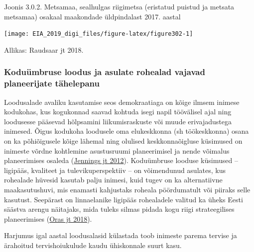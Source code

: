 \documentclass[estonian,]{article}
\begin{document}
{Joonis 3.0.2.} Metsamaa, sealhulgas riigimetsa (eristatud puistud ja metsata metsamaa) osakaal maakondade üldpindalast 2017. aastal

\begin{center}\texttt{[image: EIA\_2019\_digi\_files/figure-latex/figure302-1]} \end{center}

\begin{imgsource}
{Allikas:} Raudsaar jt 2018.
\end{imgsource}

\hypertarget{koduuxfcmbruse-loodus-ja-asulate-rohealad-vajavad-planeerijate-tuxe4helepanu}{%
\subsubsection*{Koduümbruse loodus ja asulate rohealad vajavad planeerijate tähelepanu}\label{koduuxfcmbruse-loodus-ja-asulate-rohealad-vajavad-planeerijate-tuxe4helepanu}}

Loodusalade avaliku kasutamise seos demokraatiaga on kõige ilmsem inimese kodukohas, kus kogukonnad saavad kohtuda isegi napil töövälisel ajal ning loodusesse pääsevad hõlpsamini liikumisraskuste või muude erivajadustega inimesed. Õigus kodukoha loodusele oma elukeskkonna (sh töökeskkonna) osana on ka põhiõigusele kõige lähemal ning olulised keskkonnaõigluse küsimused on inimeste võrdne kohtlemine asustusruumi planeerimisel ja nende võimalus planeerimises osaleda (\protect\hyperlink{Jennings2012}{Jennings jt 2012}). Koduümbruse looduse küsimused -- ligipääs, kvaliteet ja tulevikuperspektiiv -- on võimendunud asulates, kus rohealade hüvesid kasutab palju inimesi, kuid tugev on ka alternatiivne maakasutushuvi, mis enamasti kahjustaks roheala pöördumatult või piiraks selle kasutust. Seepärast on linnaelanike ligipääs rohealadele valitud ka üheks Eesti säästva arengu näitajaks, mida tuleks silmas pidada kogu riigi strateegilises planeerimises (\protect\hyperlink{Oras2018}{Oras jt 2018}).

\begin{blockquote-right}
Harjumus igal aastal loodusalasid külastada toob inimeste parema tervise
ja ärahoitud tervishoiukulude kaudu ühiskonnale suurt kasu.
\end{blockquote-right}
\end{document}

